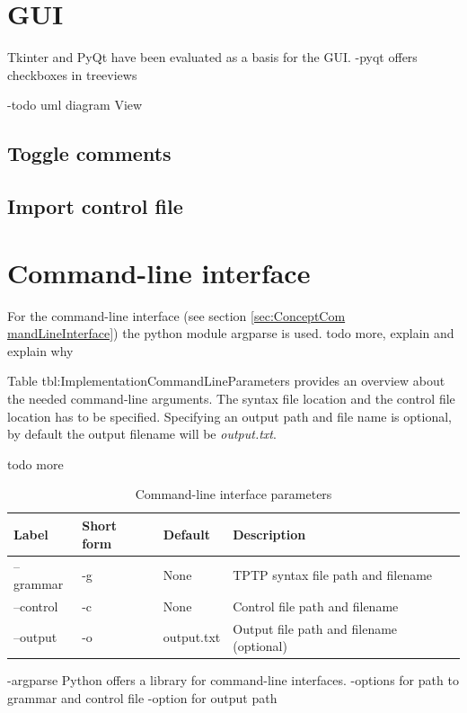 \section{GUI}\label{sec:GUI}
Tkinter and PyQt have been evaluated as a basis for the GUI.
-pyqt offers checkboxes in treeviews

-todo uml diagram View
\subsection{Toggle comments}\label{sec:GUI}
\subsection{Import control file}\label{sec:GUI}
\section{Command-line interface}\label{sec:ImplementationCommandLineInterface}
For the command-line interface (see section \ref{sec:ConceptCom mandLineInterface}) the python module argparse is used.
todo more, explain and explain why

Table \ac{tbl:ImplementationCommandLineParameters} provides an overview about the needed command-line arguments. The syntax file location and the control file location has to be specified. Specifying an output path and file name is optional, by default the output filename will be \textit{output.txt}.

todo more
\begin{table}[H]
\centering
\caption{Command-line interface parameters}
\begin{adjustbox}{width=1\textwidth, center=\textwidth}
\renewcommand{\arraystretch}{2}
\begin{tabular}{llll}
\textbf{Label} & \textbf{Short form} & \textbf{Default} & \textbf{Description}\\\hline
--grammar & -g & None & \ac{TPTP} syntax file path and filename\\
--control & -c & None &  Control file path and filename\\
--output & -o & output.txt & Output file path and filename (optional)
\end{tabular}
\end{adjustbox}
\label{tbl:ImplementationCommandLineParameters}
\end{table}

-argparse Python offers a library for command-line interfaces.
-options for path to grammar and control file
-option for output path
